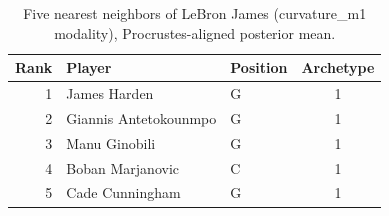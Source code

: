 \begin{table}[htbp]
  \centering\small
  \begin{tabular}{rllc}
    \toprule
    Rank & Player & Position & Archetype \\
    \midrule
    1 & James Harden & G & 1 \\
    2 & Giannis Antetokounmpo & G & 1 \\
    3 & Manu Ginobili & G & 1 \\
    4 & Boban Marjanovic & C & 1 \\
    5 & Cade Cunningham & G & 1 \\
    \bottomrule
  \end{tabular}
  \caption{Five nearest neighbors of LeBron James (curvature_m1 modality), Procrustes-aligned posterior mean.}
  \label{tab:LeBron_James_neighbors_curvature_m1}
\end{table}

